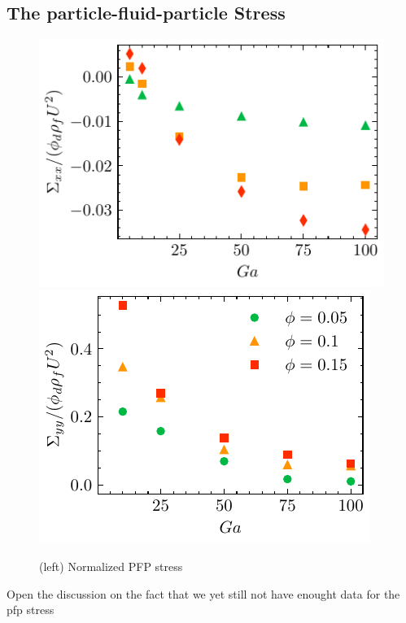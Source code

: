 \subsection{The particle-fluid-particle Stress}
\begin{figure}
    \centering
    \includegraphics[height=0.3\textwidth]{image/HOMOGENEOUS/fPA/PFPxx.pdf}
    \includegraphics[height=0.3\textwidth]{image/HOMOGENEOUS/fPA/PFPyy.pdf}
    \caption{(left) Normalized PFP stress }
\end{figure}

Open the discussion on the fact that we yet still not have enought data for the pfp stress